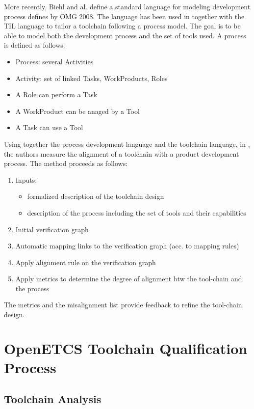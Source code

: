 \documentclass{openetcs_report}
\begin{document}
More recently, Biehl and al.  define a standard language for modeling
development process defines by OMG 2008. The language has been used in
\cite{biehl_constructing_2012,biehl_early_2012} together with the TIL
language to tailor a toolchain following a process model. The goal is
to be able to model both the development process and the set of tools
used.  A process is defined as follows:
\begin{itemize}
\item Process: several Activities
\item Activity: set of linked Tasks, WorkProducts, Roles
\item A Role can perform a Task
\item A WorkProduct can be anaged by a Tool
\item A Task can use a Tool
\end{itemize}
Using together the process development language  and the toolchain
language, in \cite{biehl_early_2012}, the authors  measure the alignment of a toolchain
with a product development process. The method proceeds as follows:
\begin{enumerate}
\item Inputs:
  \begin{itemize}
  \item formalized description of the toolchain design
  \item description of the process including the set of tools and their capabilities
  \end{itemize}
\item Initial verification graph
\item Automatic mapping links to the verification graph (acc. to mapping rules)
\item Apply alignment rule on the verification graph
\item Apply metrics to determine the degree of alignment btw the tool-chain and the
   process
\end{enumerate}
The metrics and the misalignment list provide feedback to refine the tool-chain
design.



\chapter{OpenETCS Toolchain Qualification Process}
\label{chap-2}

\section{Toolchain Analysis}
\label{sec-2-1}
\end{document}
